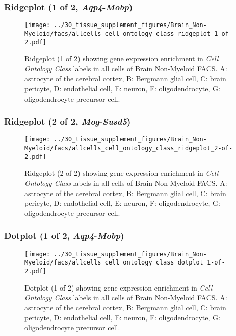 \clearpage

\subsubsection{Ridgeplot (1 of 2, \emph{Aqp4}-\emph{Mobp})}
\begin{figure}[h]
\centering
\texttt{[image: ../30\_tissue\_supplement\_figures/Brain\_Non-Myeloid/facs/allcells\_cell\_ontology\_class\_ridgeplot\_1-of-2.pdf]}

\caption{ Ridgeplot (1 of 2)  showing gene expression enrichment in \emph{Cell Ontology Class} labels in all cells of Brain Non-Myeloid FACS. A: astrocyte of the cerebral cortex, B: Bergmann glial cell, C: brain pericyte, D: endothelial cell, E: neuron, F: oligodendrocyte, G: oligodendrocyte precursor cell.}
\end{figure}


\clearpage

\subsubsection{Ridgeplot (2 of 2, \emph{Mog}-\emph{Susd5})}
\begin{figure}[h]
\centering
\texttt{[image: ../30\_tissue\_supplement\_figures/Brain\_Non-Myeloid/facs/allcells\_cell\_ontology\_class\_ridgeplot\_2-of-2.pdf]}

\caption{ Ridgeplot (2 of 2)  showing gene expression enrichment in \emph{Cell Ontology Class} labels in all cells of Brain Non-Myeloid FACS. A: astrocyte of the cerebral cortex, B: Bergmann glial cell, C: brain pericyte, D: endothelial cell, E: neuron, F: oligodendrocyte, G: oligodendrocyte precursor cell.}
\end{figure}


\clearpage

\subsubsection{Dotplot (1 of 2, \emph{Aqp4}-\emph{Mobp})}
\begin{figure}[h]
\centering
\texttt{[image: ../30\_tissue\_supplement\_figures/Brain\_Non-Myeloid/facs/allcells\_cell\_ontology\_class\_dotplot\_1-of-2.pdf]}

\caption{ Dotplot (1 of 2)  showing gene expression enrichment in \emph{Cell Ontology Class} labels in all cells of Brain Non-Myeloid FACS. A: astrocyte of the cerebral cortex, B: Bergmann glial cell, C: brain pericyte, D: endothelial cell, E: neuron, F: oligodendrocyte, G: oligodendrocyte precursor cell.}
\end{figure}


